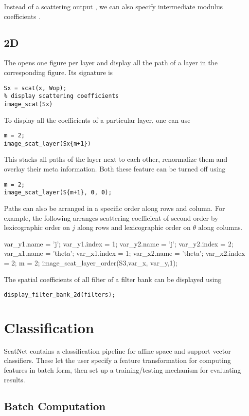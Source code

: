 \documentclass[twocolumn]{article}
\begin{document}
Instead of a scattering output , we can also specify intermediate modulus coefficients .

\subsection{2D}

The  opens one figure per layer and display all the path of a layer in the corresponding figure. Its signature is 
\begin{lstlisting}
Sx = scat(x, Wop);
% display scattering coefficients
image_scat(Sx)
\end{lstlisting}

To display all the coefficients of a particular layer, one can use 
\begin{lstlisting}
m = 2;
image_scat_layer(Sx{m+1})
\end{lstlisting}
This stacks all paths of the layer next to each other, renormalize them and overlay their meta information. Both these feature can be turned off using
\begin{lstlisting}
m = 2;
image_scat_layer(S{m+1}, 0, 0);
\end{lstlisting}
Paths can also be arranged in a specific order along rows and column.
For example, the following arranges scattering coefficient of second order
by lexicographic order on $j$ along rows and lexicographic order on $\theta$ along columns.

var_y{1}.name = 'j';
var_y{1}.index = 1;
var_y{2}.name = 'j';
var_y{2}.index = 2;
var_x{1}.name = 'theta';
var_x{1}.index = 1;
var_x{2}.name = 'theta';
var_x{2}.index = 2;
m = 2;
image_scat_layer_order(S{3},var_x, var_y,1);

The spatial coefficients of all filter of a filter bank can be displayed using
\begin{lstlisting}
display_filter_bank_2d(filters);
\end{lstlisting}

\section{Classification}

ScatNet contains a classification pipeline for affine space and support vector classifiers. These let the user specify a feature transformation for computing features in batch form, then set up a training/testing mechanism for evaluating results.

\subsection{Batch Computation}
\end{document}
